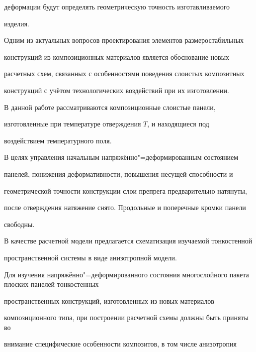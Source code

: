 деформации будут определять геометрическую точность изготавливаемого

изделия.



\smallskip


Одним из актуальных вопросов проектирования элементов размеростабильных

конструкций из композиционных материалов является обоснование новых

расчетных схем, связанных с особенностями поведения слоистых композитных

конструкций с учётом технологических воздействий при их изготовлении.



В данной работе рассматриваются композиционные слоистые панели,

изготовленные при температуре отверждения $T$, и находящиеся под

воздействием температурного поля.



В целях управления начальным напряжённо"=деформированным состоянием 

панелей, понижения деформативности, повышения несущей способности и

геометрической точности конструкции слои препрега предварительно натянуты,

после отверждения натяжение снято. Продольные и поперечные кромки панели

свободны.



В качестве расчетной модели предлагается схематизация изучаемой тонкостенной

пространственной системы в виде анизотропной модели.



\smallskip


Для изучения напряжённо"=деформированного состояния многослойного пакета плоских панелей тонкостенных

пространственных конструкций, изготовленных из новых материалов

композиционного типа, при построении расчетной схемы должны быть приняты во

внимание специфические особенности композитов, в том числе анизотропия


